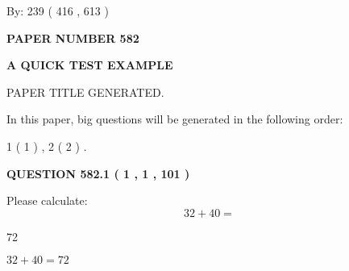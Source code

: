 \documentclass[12pt]{article}
\begin{document}
   
\hspace{1.0in} By: 
 239 ( 416 ,  613 )
   
   
   
   
\newpage 
\setcounter{page}{ 
   582001 } 
   
   
   
   
 {\textbf{ \Large{ PAPER NUMBER  582  }}}
   
   
\vspace{0.2in}
   
   
   
   
   
   
   
   
 \vspace{0.2in}
{\LARGE {\textbf{ A QUICK TEST EXAMPLE}}}
   
   
 PAPER TITLE GENERATED.
   
   
   
\vspace{0.2in}
   
In this paper, big questions will be generated in the following order: 
   
   
   1 ( 1 )
 ,
   2 ( 2 )
 .
  
\vspace{0.2in}
  
{\textbf{\Large{QUESTION
582.1 
 ( 1 , 1 , 101 )
}}}
  
  
 
Please calculate:
\begin{equation}
32 +  %
40 = \nonumber
\end{equation}
 
 
 
\noindent{}
 
 

72
 
 
\noindent{}
 
 

 
 
 
\noindent{}
 
 

$ %
32 +  %
40=   %
72$
 
 
\noindent{}
 
\end{document}
